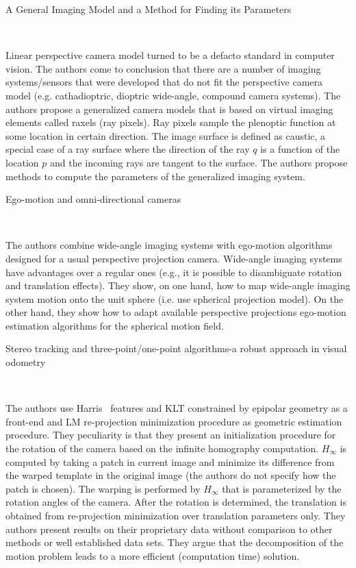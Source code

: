 \documentclass[10pt]{article}         %
\begin{document}
\begin{enumerate}
  {\Large \item A General Imaging Model and a Method for Finding its
    Parameters}~\cite{grossberg2001general}

  Linear perspective camera model turned to be a defacto standard in
  computer vision.  The authors come to conclusion that there are a
  number of imaging systems/sensors that were developed that do not
  fit the perspective camera model (e.g. cathadioptric, dioptric
  wide-angle, compound camera systems).  The authors propose a
  generalized camera models that is based on virtual imaging elements
  called raxels (ray pixels).  Ray pixels sample the plenoptic
  function at some location in certain direction.  The image surface
  is defined as caustic, a special case of a ray surface where the
  direction of the ray $q$ is a function of the location $p$ and the
  incoming rays are tangent to the surface.  The authors propose
  methods to compute the parameters of the generalized imaging system.

  {\Large \item Ego-motion and omni-directional
    cameras}~\cite{gluckman1998ego}

  The authors combine wide-angle imaging systems with ego-motion
  algorithms designed for a usual perspective projection camera.
  Wide-angle imaging systems have advantages over a regular ones
  (e.g., it is possible to disambiguate rotation and translation
  effects). They show, on one hand, how to map wide-angle imaging
  system motion onto the unit sphere (i.e. use spherical projection
  model). On the other hand, they show how to adapt available
  perspective projections ego-motion estimation algorithms for the
  spherical motion field.

  {\Large \item Stereo tracking and three-point/one-point algorithms-a robust approach in visual odometry}~\cite{ni2006stereo}

  The authors use Harris~\cite{harris1988combined} features and KLT
  constrained by epipolar geometry as a front-end and LM re-projection
  minimization procedure as geometric estimation procedure.  They
  peculiarity is that they present an initialization procedure for the
  rotation of the camera based on the infinite homography
  computation. $H_{\infty}$ is computed by taking a patch in current
  image and minimize its difference from the warped template in the
  original image (the authors do not specify how the patch is chosen).
  The warping is performed by $H_{\infty}$ that is parameterized by the
  rotation angles of the camera. After the rotation is determined, the
  translation is obtained from re-projection minimization over
  translation parameters only. They authors present results on their
  proprietary data without comparison to other methods or well
  established data sets.  They argue that the decomposition of the
  motion problem leads to a more efficient (computation time)
  solution.


\end{enumerate}
\end{document}
